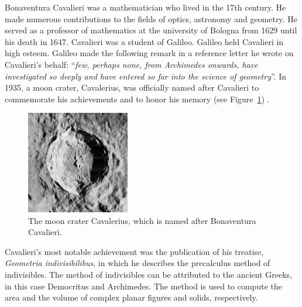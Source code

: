 \documentclass{article}
\theoremstyle{theorem}
\theoremstyle{definition}
\begin{document}
\noindent
Bonaventura Cavalieri was a mathematician who lived in the 17th century. He made numerous contributions to the fields of optics, astronomy and geometry.
He served as a professor of mathematics at the university of Bologna from 1629 until his death in 1647. 
Cavalieri was a student of Galileo. Galileo held Cavalieri in high esteem. Galileo made the following remark in a reference letter he wrote on Cavalieri's behalf: ``\emph{few, perhaps none, from 
Archimedes onwards, have investigated so deeply and have entered so far into the science of geometry}''. In 1935, a moon crater, Cavalerius, was officially named after Cavalieri to commemorate his achievements and to honor his memory (see Figure~\ref{fig:crater}) \cite{?}. 
\begin{figure}[htb]
\centering
\includegraphics[width=0.4\textwidth]{crater.jpg}
\caption{The moon crater Cavalerius, which is named after Bonaventura Cavalieri.}
\label{fig:crater}
\end{figure}
Cavalieri's most notable achievement was the publication of his 
treatise, \emph{Geometria indivisibilibus}, in which he describes the precalculus method of indivisibles. The method of indivisibles can be attributed to the ancient Greeks,
in this case Democritus and Archimedes. The method is used to compute the area and the volume of complex planar figures and solids, respectively.\\
\end{document}
